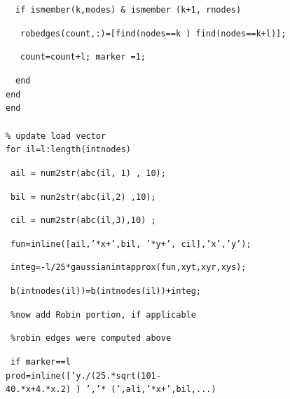 \documentclass[../main.tex]{subfiles}
\begin{document}
~~\texttt{if ismember(k,modes) \& ismember (k+1, rnodes) }

~~~\texttt{robedges(count,:)=[find(nodes==k ) find(nodes==k+l)]; }

~~~\texttt{count=count+l; marker =1;}

~~\texttt{end}\\
\texttt{end}\\
\texttt{end}
\\
\\
\texttt{\% update load vector }\\
\texttt{for il=l:length(intnodes) }

~\texttt{ail = num2str(abc(il, 1) , 10); }

~\texttt{bil = nun2str(abc(il,2) ,10);}

~\texttt{cil = num2str(abc(il,3),10) ;}

~\texttt{fun=inline([ail,'*x+',bil, '*y+', cil],'x','y'); }

~\texttt{integ=-l/25*gaussianintapprox(fun,xyt,xyr,xys); 
}

~\texttt{b(intnodes(il))=b(intnodes(il))+integ; }

~\texttt{\%now add Robin portion, if applicable 
}

~\texttt{\%robin edges were computed above 
}

~\texttt{if marker==l 
}\\
\texttt{prod=inline(['y./(25.*sqrt(101-}\\
\texttt{40.*x+4.*x.2) ) ','* (',ali,'*x+',bil,...)}
\end{document}

